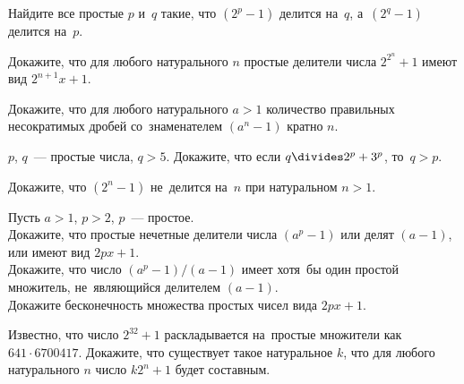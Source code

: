 \begin{problems}

\item
Найдите все простые $p$ и~$q$ такие, что $(2^p - 1)$ делится на~$q$,
а~$(2^q - 1)$ делится на~$p$.

\item
Докажите, что для любого натурального $n$ простые делители числа $2^{2^n} + 1$
имеют вид $2^{n+1} x + 1$.

\item
Докажите, что для любого натурального $a > 1$ количество правильных
несократимых дробей со~знаменателем $(a^n - 1)$ кратно $n$.

\item
$p$, $q$~— простые числа, $q > 5$.
Докажите, что если $q \divides 2^p + 3^p$, то~$q > p$.

\item
Докажите, что $(2^n - 1)$ не~делится на~$n$ при натуральном $n > 1$.

\item
Пусть $a > 1$, $p > 2$, $p$~— простое.
\\
\subproblem
Докажите, что простые нечетные делители числа $(a^p - 1)$ или делят $(a - 1)$,
или имеют вид $2 p x + 1$.
\\
\subproblem
Докажите, что число $(a^p - 1) / (a - 1)$ имеет хотя~бы один простой
множитель, не~являющийся делителем $(a - 1)$.
\\
\subproblem
Докажите бесконечность множества простых чисел вида $2 p x + 1$.

\item
Известно, что число $2^{32} + 1$ раскладывается на~простые множители как
$641 \cdot 6700417$.
Докажите, что существует такое натуральное $k$, что для любого
натурального $n$ число $k 2^n + 1$ будет составным.

\end{problems}

